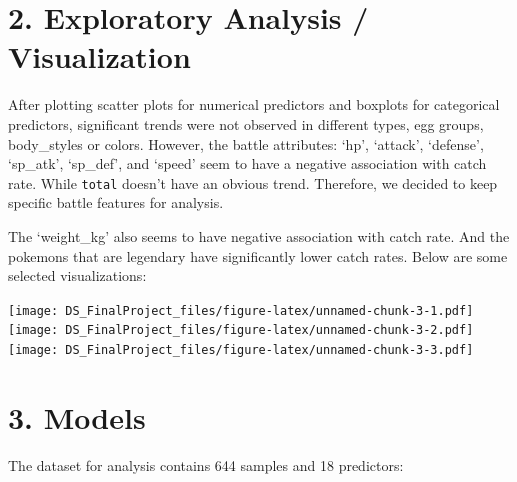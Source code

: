 \documentclass[
]{article}
\begin{document}
\hypertarget{exploratory-analysis-visualization}{%
\section{2. Exploratory Analysis /
Visualization}\label{exploratory-analysis-visualization}}

After plotting scatter plots for numerical predictors and boxplots for
categorical predictors, significant trends were not observed in
different types, egg groups, body\_styles or colors. However, the battle
attributes: `hp', `attack', `defense', `sp\_atk', `sp\_def', and `speed'
seem to have a negative association with catch rate. While
\texttt{total} doesn't have an obvious trend. Therefore, we decided to
keep specific battle features for analysis.

The `weight\_kg' also seems to have negative association with catch
rate. And the pokemons that are legendary have significantly lower catch
rates. Below are some selected visualizations:

\texttt{[image: DS\_FinalProject\_files/figure-latex/unnamed-chunk-3-1.pdf]}
\texttt{[image: DS\_FinalProject\_files/figure-latex/unnamed-chunk-3-2.pdf]}
\texttt{[image: DS\_FinalProject\_files/figure-latex/unnamed-chunk-3-3.pdf]}

\hypertarget{models}{%
\section{3. Models}\label{models}}

The dataset for analysis contains 644 samples and 18 predictors:
\end{document}
